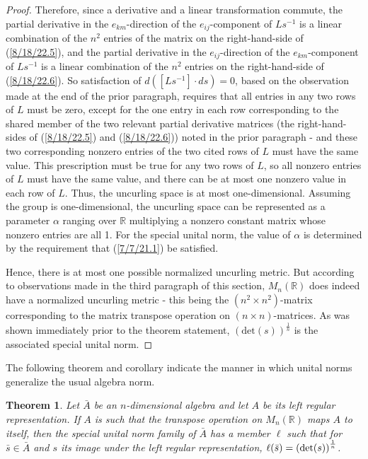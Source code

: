 \documentclass{amsart}
\numberwithin{equation}{section}
\newtheorem{theorem}{Theorem}
\theoremstyle{definition}
\numberwithin{theorem}{section}
\begin{document}
\begin{proof}
Therefore, since a derivative and a linear transformation commute, the partial derivative in the $e_{km}$-direction of the $e_{ij}$-component of $Ls^{-1}$ is a linear combination of the $n^2$ entries of the matrix on the right-hand-side of (\ref{8/18/22.5}), and  the partial derivative in the $e_{ij}$-direction of the $e_{km}$-component of $Ls^{-1}$ is a linear combination of the $n^2$ entries on the right-hand-side of (\ref{8/18/22.6}).
So satisfaction of \mbox{$d\left([Ls^{-1}]\cdot ds\right) = 0$,} based on the observation made at the end of the prior paragraph, requires that all entries in any two rows of $L$ must be zero, except for the one entry in each row corresponding to the shared member of the two relevant partial derivative matrices (the right-hand-sides of (\ref{8/18/22.5}) and (\ref{8/18/22.6})) noted in the prior paragraph - and these two corresponding nonzero entries of the two cited rows of $L$ must have the same value.  This prescription must be true for any two rows of $L$, so all nonzero entries of $L$ must have the same value, and there can be at most one nonzero value in each row of $L$.  Thus, the uncurling space is at most one-dimensional. Assuming the group is one-dimensional, the uncurling space can be represented as a parameter $\alpha$ ranging over $\mathbb{R}$ multiplying a nonzero constant matrix whose nonzero entries are all 1.  
For the special unital norm, the value of $\alpha$ is determined by the requirement that (\ref{7/7/21.1}) be satisfied. 


Hence, there is at most one possible normalized uncurling metric.  But according to observations made in the third paragraph of this section, $ M_n(\mathbb{R})$ does indeed have a normalized uncurling metric - this being the $(n^2\times n^2)$-matrix corresponding to the matrix transpose operation on $(n\times n)$-matrices.  As was shown immediately prior to the theorem statement, $(\mbox{det}(s))^{\frac{1}{n}}$ is the associated special unital norm.  
 \end{proof}
 
 The following theorem and corollary indicate the manner in which unital norms generalize the usual algebra norm. 
 
 
 \begin{theorem}\label{5/13/22.1} Let $\bar{A}$ be an $n$-dimensional algebra and let $A$ be its left regular representation.  If $A$ is such that the transpose operation on $ M_n(\mathbb{R})$ maps $A$ to itself, then the special unital norm family of $\bar{A}$ has a member $\ell$ such that  for $\bar{s}\in\bar{A}$ and $s$ its image under the left regular representation, $\ell(\bar{s}) = \left({\rm det}(s)\right)^{\frac{1}{n}}$. 
\end{theorem}
\end{document}
